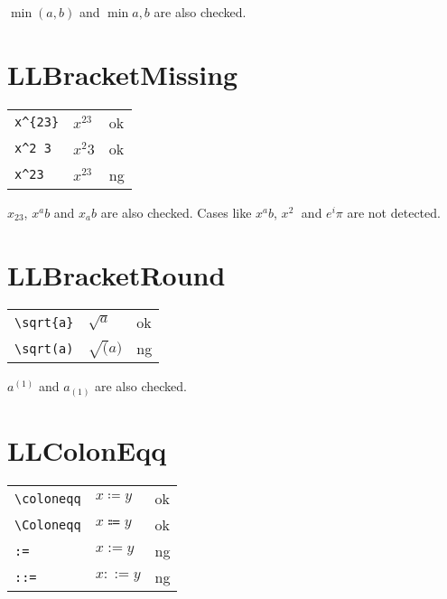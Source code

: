 \documentclass[a4paper]{article}
\newcommand{\tA}[1]{\textcolor{cA}{#1}}
\newcommand{\tD}[1]{\textcolor{cD}{#1}}
\begin{document}
$\min(a,b)$ and $\min{a,b}$ are also checked.

\section{LLBracketMissing}

\begin{table}[H]
	\centering
	\begin{tabular}{lll}
		\verb|x^{23}| & $x^{23}$ & \tA{ok} \\
		\verb|x^2 3|  & $x^2 3$  & \tA{ok} \\
		\verb|x^23|   & $x^23$   & \tD{ng} \\
	\end{tabular}
\end{table}

$x_23$, $x^ab$ and $x_ab$ are also checked.
Cases like $x^a b$, $x^2\;$ and $e^i\pi$ are not detected.


\section{LLBracketRound}

\begin{table}[h]
	\centering
	\begin{tabular}{lll}
		\verb|\sqrt{a}| & $\sqrt{a}$ & \tA{ok} \\
		\verb|\sqrt(a)| & $\sqrt(a)$ & \tD{ng} \\
	\end{tabular}
\end{table}

$a^(1)$ and $a_(1)$ are also checked.

\section{LLColonEqq}

\begin{table}[H]
	\centering
	\begin{tabular}{lll}
		\verb|\coloneqq| & $x\coloneqq y$ & \tA{ok} \\
		\verb|\Coloneqq| & $x\Coloneqq y$ & \tA{ok} \\
		\verb|:=|        & $x:= y$        & \tD{ng} \\
		\verb|::=|       & $x::= y$       & \tD{ng}
	\end{tabular}
\end{table}
\end{document}
